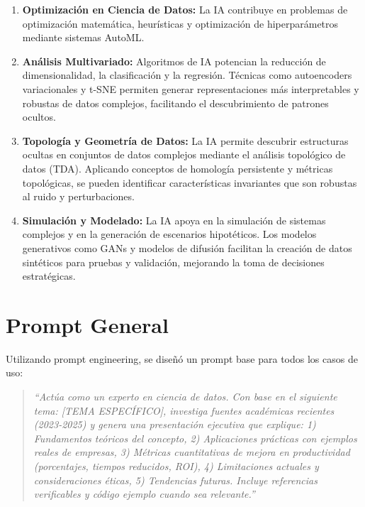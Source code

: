\documentclass[11pt]{article}
\begin{document}
    \begin{enumerate}
        \item \textbf{Optimizaci\'on en Ciencia de Datos:} La IA contribuye en problemas de optimizaci\'on matem\'atica, heur\'isticas y optimizaci\'on de hiperpar\'ametros mediante sistemas AutoML.

        \item \textbf{An\'alisis Multivariado:} Algoritmos de IA potencian la reducci\'on de dimensionalidad, la clasificaci\'on y la regresi\'on. T\'ecnicas como autoencoders variacionales y t-SNE permiten generar representaciones m\'as interpretables y robustas de datos complejos, facilitando el descubrimiento de patrones ocultos.

        \item \textbf{Topolog\'ia y Geometr\'ia de Datos:} La IA permite descubrir estructuras ocultas en conjuntos de datos complejos mediante el an\'alisis topol\'ogico de datos (TDA). Aplicando conceptos de homolog\'ia persistente y m\'etricas topol\'ogicas, se pueden identificar caracter\'isticas invariantes que son robustas al ruido y perturbaciones.

        \item \textbf{Simulaci\'on y Modelado:} La IA apoya en la simulaci\'on de sistemas complejos y en la generaci\'on de escenarios hipot\'eticos. Los modelos generativos como GANs y modelos de difusi\'on facilitan la creaci\'on de datos sint\'eticos para pruebas y validaci\'on, mejorando la toma de decisiones estrat\'egicas.
    \end{enumerate}

    \section*{Prompt General}
    Utilizando prompt engineering, se dise\~n\'o un prompt base para todos los casos de uso:

    \begin{quote}
        \textit{``Act\'ua como un experto en ciencia de datos. Con base en el siguiente tema: [TEMA ESPEC\'IFICO], investiga fuentes acad\'emicas recientes (2023-2025) y genera una presentaci\'on ejecutiva que explique: 1) Fundamentos te\'oricos del concepto, 2) Aplicaciones pr\'acticas con ejemplos reales de empresas, 3) M\'etricas cuantitativas de mejora en productividad (porcentajes, tiempos reducidos, ROI), 4) Limitaciones actuales y consideraciones \'eticas, 5) Tendencias futuras. Incluye referencias verificables y c\'odigo ejemplo cuando sea relevante.''}
    \end{quote}
\end{document}

